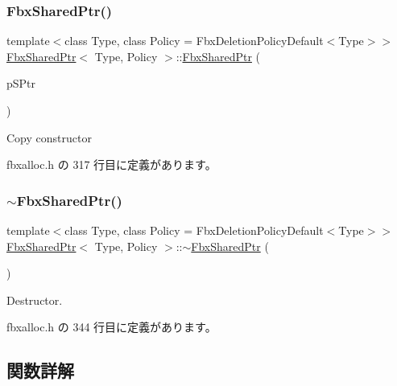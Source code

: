 \subsubsection{\texorpdfstring{Fbx\+Shared\+Ptr()}{FbxSharedPtr()}\hspace{0.1cm}{\footnotesize\ttfamily [3/3]}}
{\footnotesize\ttfamily template$<$class Type, class Policy = Fbx\+Deletion\+Policy\+Default$<$\+Type$>$$>$ \\
\hyperlink{class_fbx_shared_ptr}{Fbx\+Shared\+Ptr}$<$ Type, Policy $>$\+::\hyperlink{class_fbx_shared_ptr}{Fbx\+Shared\+Ptr} (\begin{DoxyParamCaption}\item[{const \hyperlink{class_fbx_shared_ptr}{Fbx\+Shared\+Ptr}$<$ Type, Policy $>$ \&}]{p\+S\+Ptr }\end{DoxyParamCaption})\hspace{0.3cm}{\ttfamily [inline]}}



Copy constructor 



 fbxalloc.\+h の 317 行目に定義があります。

\mbox{\label{class_fbx_shared_ptr_a15061ed1e4085e6a053c66b88c509ae6}} 
\subsubsection{\texorpdfstring{$\sim$\+Fbx\+Shared\+Ptr()}{~FbxSharedPtr()}}
{\footnotesize\ttfamily template$<$class Type, class Policy = Fbx\+Deletion\+Policy\+Default$<$\+Type$>$$>$ \\
\hyperlink{class_fbx_shared_ptr}{Fbx\+Shared\+Ptr}$<$ Type, Policy $>$\+::$\sim$\hyperlink{class_fbx_shared_ptr}{Fbx\+Shared\+Ptr} (\begin{DoxyParamCaption}{ }\end{DoxyParamCaption})\hspace{0.3cm}{\ttfamily [inline]}}



Destructor. 



 fbxalloc.\+h の 344 行目に定義があります。



\subsection{関数詳解}
\mbox{\label{class_fbx_shared_ptr_a706fe3ede6f8a43589348169f4803c75}} 
